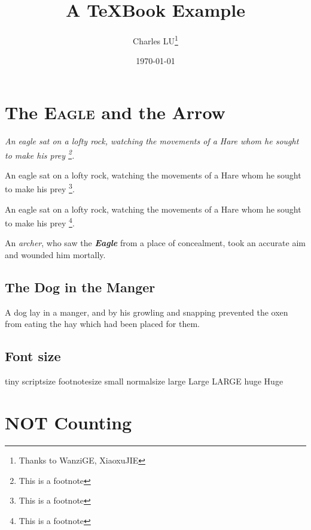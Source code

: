 \documentclass[letterpaper,12pt,oneside]{book} %
\title{A \TeX Book Example}
\author{Charles LU\thanks{Thanks to WanziGE, XiaoxuJIE}}
\date{\today}
\begin{document}
\frontmatter
\maketitle
\tableofcontents
\listoffigures
\listoftables

\mainmatter
%
%

\chapter{The \textsc{Eagle} and the Arrow}
\itshape
An eagle sat on a lofty rock, watching the movements of a
Hare whom he sought to make his prey \footnote{This is a footnote}.

An eagle sat on a lofty rock, watching the movements of a
Hare whom he sought to make his prey \footnote{This is a footnote}.
\upshape

\begin{itshape}
An eagle sat on a lofty rock, watching the movements of a
Hare whom he sought to make his prey \footnote{This is a footnote}.
\end{itshape}

An \textsl{archer}, who saw the \textbf{{\it Eagle}} from a place of concealment,
took an accurate aim and wounded him mortally.

\section{The Dog in the Manger}

A dog lay in a manger, and by his growling and snapping
prevented the oxen from eating the hay which had been
placed for them.

\section{Font size}
{\tiny tiny}
{\scriptsize scriptsize}
{\footnotesize footnotesize}
{\small small}
{\normalsize normalsize}
{\large large}
{\Large Large}
{\LARGE LARGE}
{\huge huge}
{\Huge Huge}

\chapter*{NOT Counting}

\backmatter
\appendix

\end{document}
